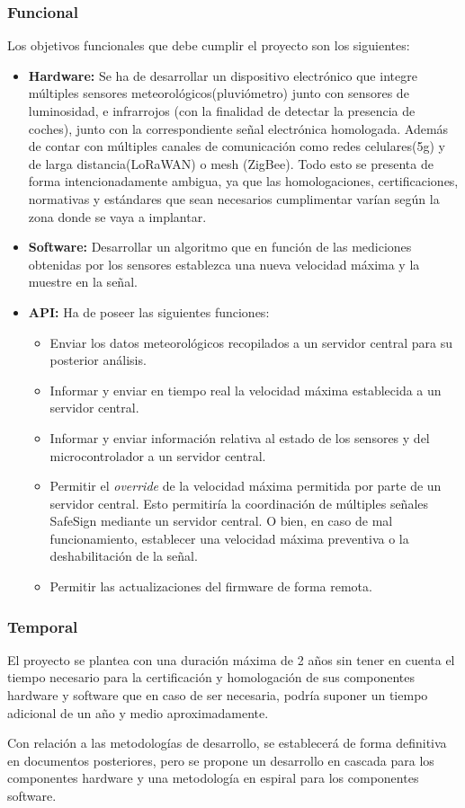 \documentclass[
	a4paper, %
	12pt, %
]{CSSullivanBusinessReport}
\begin{document}
\begin{fullwidth}
\subsubsection{Funcional}
 Los objetivos funcionales que debe cumplir el proyecto son los siguientes: 
  \begin{itemize}
      \item \textbf{Hardware:} Se ha de desarrollar un dispositivo electrónico que integre múltiples sensores meteorológicos(pluviómetro) junto con sensores de luminosidad, e infrarrojos (con la finalidad de detectar la presencia de coches), junto con la correspondiente señal electrónica homologada. Además de contar con múltiples canales de comunicación como redes celulares(5g) y de larga distancia(LoRaWAN) o mesh (ZigBee). Todo esto se presenta de forma intencionadamente ambigua, ya que las homologaciones, certificaciones, normativas y estándares que sean necesarios cumplimentar varían según la zona donde se vaya a implantar.
      \item \textbf{Software:} Desarrollar un algoritmo que en función de las mediciones obtenidas por los sensores establezca una nueva velocidad máxima y la muestre en la señal.
      \item \textbf{ API:} Ha de poseer las siguientes funciones: 
      \begin{itemize}
          \item   Enviar los datos meteorológicos recopilados a un servidor central para su posterior análisis.
          \item Informar y enviar en tiempo real la velocidad máxima establecida a un servidor central.
          \item Informar y enviar información relativa al estado de los sensores y del microcontrolador a un servidor central.
          \item Permitir el \textit{override} de la velocidad máxima permitida por parte de un servidor central. Esto permitiría la coordinación de múltiples señales SafeSign mediante un servidor central. O bien, en caso de mal funcionamiento, establecer una velocidad máxima preventiva o la deshabilitación de la señal.
          \item Permitir las actualizaciones del firmware de forma remota.
          
      \end{itemize}
      
  \end{itemize}
\subsubsection{Temporal}
El proyecto se plantea con una duración máxima de 2 años sin tener en cuenta el tiempo necesario para la certificación y homologación de sus componentes hardware y software  que en caso de ser necesaria, podría suponer un tiempo adicional de un año y medio aproximadamente.
\par
 Con relación a las metodologías de desarrollo, se establecerá de forma definitiva en documentos posteriores, pero se propone un desarrollo en cascada para los componentes hardware y una metodología en espiral para los componentes software.


\end{fullwidth}
\end{document}
